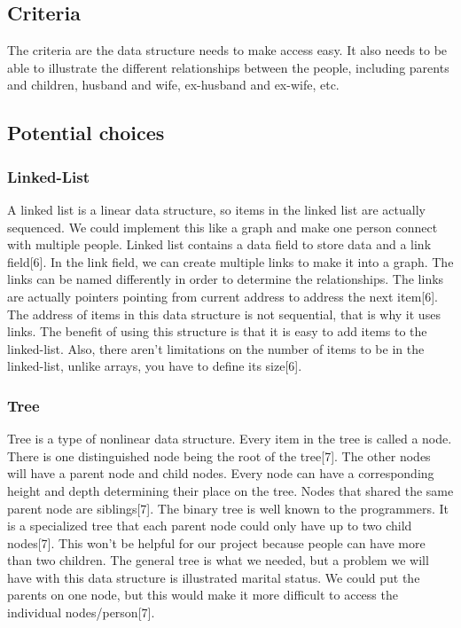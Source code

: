 \documentclass[onecolumn, draftclsnofoot,10pt, compsoc]{IEEEtran}
\begin{document}
\subsection{Criteria}
\begin{singlespace}
The criteria are the data structure needs to make access easy. It also needs to be able to illustrate the different relationships between the people, including parents and children, husband and wife, ex-husband and ex-wife, etc. 
\end{singlespace}

\subsection{Potential choices}

\subsubsection{Linked-List}
\begin{singlespace}
A linked list is a linear data structure, so items in the linked list are actually sequenced. We could implement this like a graph and make one person connect with multiple people. Linked list contains a data field to store data and a link field[6]. In the link field, we can create multiple links to make it into a graph. The links can be named differently in order to determine the relationships. The links are actually pointers pointing from current address to address the next item[6]. The address of items in this data structure is not sequential, that is why it uses links. The benefit of using this structure is that it is easy to add items to the linked-list. Also, there aren't limitations on the number of items to be in the linked-list, unlike arrays, you have to define its size[6].
\end{singlespace}

\subsubsection{Tree}
\begin{singlespace}
Tree is a type of nonlinear data structure. Every item in the tree is called a node. There is one distinguished node being the root of the tree[7]. The other nodes will have a parent node and child nodes. Every node can have a corresponding height and depth determining their place on the tree. Nodes that shared the same parent node are siblings[7]. The binary tree is well known to the programmers. It is a specialized tree that each parent node could only have up to two child nodes[7]. This won't be helpful for our project because people can have more than two children. The general tree is what we needed, but a problem we will have with this data structure is illustrated marital status. We could put the parents on one node, but this would make it more difficult to access the individual nodes/person[7].
\end{singlespace}
 
\end{document}
